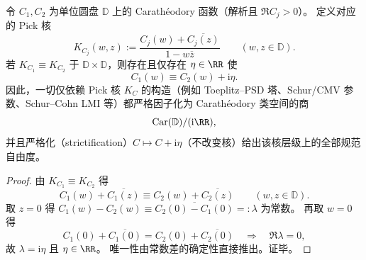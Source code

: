 \begin{theorem}\label{thm:xi-pick-kernel-gauge-rigidity}
令 \(C_1,C_2\) 为单位圆盘 \(\mathbb D\) 上的 Carath\'eodory 函数（解析且 \(\Re C_j>0\)）。
定义对应的 Pick 核
\[
K_{C_j}(w,z):=\frac{C_j(w)+\overline{C_j(z)}}{1-w\overline z}\qquad(w,z\in\mathbb D).
\]
若 \(K_{C_1}\equiv K_{C_2}\) 于 \(\mathbb D\times\mathbb D\)，则存在且仅存在 \(\eta\in\RR\) 使
\[
C_1(w)\equiv C_2(w)+\mathrm{i}\eta.
\]
因此，一切仅依赖 Pick 核 \(K_C\) 的构造（例如 Toeplitz--PSD 塔、Schur/CMV 参数、Schur--Cohn LMI 等）都严格因子化为 Carath\'eodory 类空间的商
\[
\mathrm{Car}(\mathbb D)/(\mathrm{i}\RR),
\]
并且严格化（strictification）\(C\mapsto C+\mathrm{i}\eta\)（不改变核）给出该核层级上的全部规范自由度。
\end{theorem}
\begin{proof}
由 \(K_{C_1}\equiv K_{C_2}\) 得
\[
C_1(w)+\overline{C_1(z)}\equiv C_2(w)+\overline{C_2(z)}\qquad(w,z\in\mathbb D).
\]
取 \(z=0\) 得
\(
C_1(w)-C_2(w)\equiv \overline{C_2(0)-C_1(0)}=:\lambda
\)
为常数。
再取 \(w=0\) 得
\[
C_1(0)+\overline{C_1(0)}=C_2(0)+\overline{C_2(0)}
\quad\Longrightarrow\quad
\Re\lambda=0,
\]
故 \(\lambda=\mathrm{i}\eta\) 且 \(\eta\in\RR\)。
唯一性由常数差的确定性直接推出。证毕。
\end{proof}

